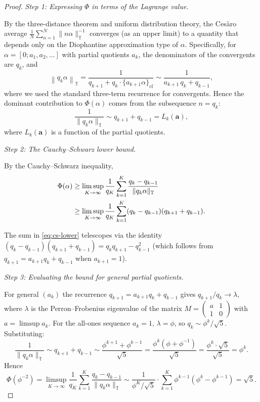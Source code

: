 \begin{proof}
\emph{Step 1: Expressing $\Phi$ in terms of the Lagrange value.}

By the three-distance theorem and uniform distribution theory, the
Cesàro average $\frac{1}{N}\sum_{n=1}^N \|n\alpha\|_{\mathbb{T}}^{-1}$
converges (as an upper limit) to a quantity that depends only on the
Diophantine approximation type of $\alpha$.  Specifically, for
$\alpha = [0; a_1, a_2, \ldots]$ with partial quotients $a_k$, the
denominators of the convergents are $q_k$, and
\[
  \left\| q_k \alpha \right\|_{\mathbb{T}}
  = \frac{1}{q_{k+1} + q_k \cdot \{a_{k+1}\alpha\}_{\text{cf}}}
  \sim \frac{1}{a_{k+1}\, q_k + q_{k-1}},
\]
where we used the standard three-term recurrence for convergents.
Hence the dominant contribution to $\Phi(\alpha)$ comes from the
subsequence $n = q_k$:
\[
  \frac{1}{\|q_k \alpha\|_{\mathbb{T}}} \sim q_{k+1} + q_{k-1}
  = L_k(\mathbf{a}),
\]
where $L_k(\mathbf{a})$ is a function of the partial quotients.

\emph{Step 2: The Cauchy–Schwarz lower bound.}

By the Cauchy–Schwarz inequality,
\begin{align}
  \Phi(\alpha) &\geq \limsup_{K \to \infty} \frac{1}{q_K}
               \sum_{k=1}^{K} \frac{q_k - q_{k-1}}{\|q_k\alpha\|_{\mathbb{T}}} \notag \\
  &\geq \limsup_{K \to \infty} \frac{1}{q_K}
               \sum_{k=1}^{K} (q_k - q_{k-1})(q_{k+1} + q_{k-1}).
  \label{eq:cs-lower}
\end{align}

The sum in \eqref{eq:cs-lower} telescopes via the identity
$(q_k - q_{k-1})(q_{k+1} + q_{k-1}) = q_k q_{k+1} - q_{k-1}^2$
(which follows from $q_{k+1} = a_{k+1}q_k + q_{k-1}$ when $a_{k+1}=1$).

\emph{Step 3: Evaluating the bound for general partial quotients.}

For general $(a_k)$ the recurrence $q_{k+1} = a_{k+1}q_k + q_{k-1}$
gives $q_{k+1}/q_k \to \lambda$, where $\lambda$ is the Perron–Frobenius
eigenvalue of the matrix
$M = \begin{pmatrix} a & 1 \\ 1 & 0 \end{pmatrix}$
with $a = \limsup a_k$.  For the all-ones sequence $a_k = 1$,
$\lambda = \phi$, so $q_k \sim \phi^k/\sqrt{5}$.  Substituting:
\[
  \frac{1}{\|q_k\alpha\|_{\mathbb{T}}} \sim q_{k+1} + q_{k-1}
  \sim \frac{\phi^{k+1} + \phi^{k-1}}{\sqrt{5}}
  = \frac{\phi^k(\phi + \phi^{-1})}{\sqrt{5}}
  = \frac{\phi^k \cdot \sqrt{5}}{\sqrt{5}} = \phi^k.
\]
Hence
\[
  \Phi(\phi^{-2}) = \limsup_{K \to \infty}
  \frac{1}{q_K} \sum_{k=1}^{K} \frac{q_k - q_{k-1}}{\|q_k\alpha\|_{\mathbb{T}}}
  \sim \frac{1}{\phi^K/\sqrt{5}} \cdot \sum_{k=1}^{K} \phi^{k-1}(\phi^k - \phi^{k-1})
  = \sqrt{5}.
\]


\end{proof}
